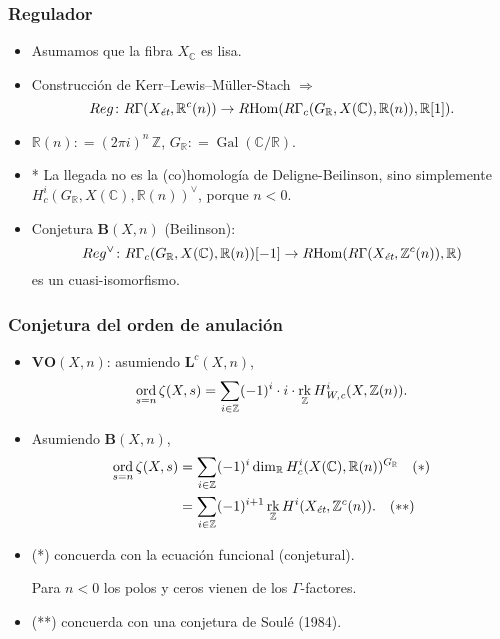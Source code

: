 \documentclass[handout]{beamer}
\newcommand{\CC}{\mathbb{C}}
\newcommand{\RR}{\mathbb{R}}
\newcommand{\ZZ}{\mathbb{Z}}
\DeclareMathOperator{\Gal}{Gal}
\newcommand{\dfn}{\mathrel{\mathop:}=}
\DeclareMathOperator{\Hom}{Hom}
\DeclareMathOperator{\ord}{ord}
\DeclareMathOperator{\rk}{rk}
\newcommand{\et}{\text{\it ét}}
\newcommand{\Wc}{\text{\it W,c}}
\newcommand{\RHom}{R\!\Hom}
\begin{document}

\begin{frame}
  \frametitle{Regulador}

  \begin{itemize}
  \item Asumamos que la fibra $X_\CC$ es lisa.

  \item Construcción de Kerr--Lewis--Müller-Stach $\Longrightarrow$
    \[ Reg\colon R\Gamma (X_\et, \RR^c (n)) \to
      \RHom (R\Gamma_c (G_\RR, X(\CC), \RR (n)), \RR[1]). \]

  \item $\RR(n) \dfn (2\pi i)^n\,\ZZ$, $G_\RR \dfn \Gal (\CC/\RR)$.

  \item * La llegada no es la (co)homología de Deligne-Beilinson, sino
    simplemente $H_c^i (G_\RR, X(\CC), \RR (n))^\vee$, porque $n < 0$.

  \item Conjetura $\mathbf{B} (X,n)$ (Beilinson):
    \[ Reg^\vee\colon R\Gamma_c (G_\RR, X (\CC), \RR (n)) [-1] \to
      \RHom (R\Gamma (X_\et, \ZZ^c (n)), \RR) \]
    es un cuasi-isomorfismo.
  \end{itemize}
\end{frame}


\begin{frame}
  \frametitle{Conjetura del orden de anulación}

  \begin{itemize}
  \item $\mathbf{VO} (X,n)$: asumiendo $\mathbf{L}^c (X,n)$,
    \[ \ord_{s=n} \zeta (X,s) =
      \sum_{i \in \ZZ} (-1)^i \cdot i \cdot \rk_\ZZ H^i_\Wc (X, \ZZ (n)). \]

  \item Asumiendo $\mathbf{B} (X,n)$,
    \begin{align*}
      \ord_{s=n} \zeta (X,s) & = \sum_{i \in \ZZ} (-1)^i \dim_\RR H^i_c (X(\CC), \RR (n))^{G_\RR} \quad (*) \\
                             & = \sum_{i \in \ZZ} (-1)^{i+1} \rk_\ZZ H^i (X_\et, \ZZ^c (n)). \quad (**)
    \end{align*}

  \item (*) concuerda con la ecuación funcional (conjetural).

    Para $n < 0$ los polos y ceros vienen de los $\Gamma$-factores.

  \item (**) concuerda con una conjetura de Soulé (1984).
  \end{itemize}
\end{frame}
\end{document}
